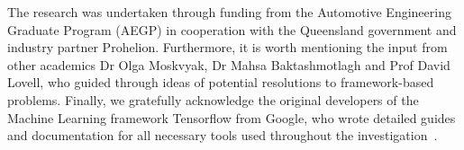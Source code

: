 The research was undertaken through funding from the Automotive Engineering Graduate Program (AEGP) in cooperation with the Queensland government and industry partner Prohelion.
Furthermore, it is worth mentioning the input from other academics Dr Olga Moskvyak, Dr Mahsa Baktashmotlagh and Prof David Lovell, who guided through ideas of potential resolutions to framework-based problems.
Finally, we gratefully acknowledge the original developers of the Machine Learning framework Tensorflow from Google, who wrote detailed guides and documentation for all necessary tools used throughout the investigation~\cite{tensorflow2015-whitepaper}.

